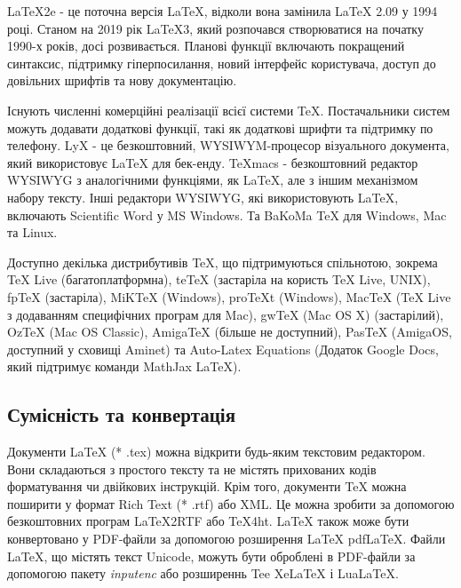 	LaTeX2e - це поточна версія LaTeX, відколи вона замінила LaTeX 2.09 у 1994 році. Станом на 2019 рік LaTeX3, який розпочався створюватися на початку 1990-х років, досі розвивається. Планові функції включають покращений синтаксис, підтримку гіперпосилання, новий інтерфейс користувача, доступ до довільних шрифтів та нову документацію.\cite{latex3}
	
	Існують численні комерційні реалізації всієї системи TeX. Постачальники систем можуть додавати додаткові функції, такі як додаткові шрифти та підтримку по телефону. LyX - це безкоштовний, WYSIWYM-процесор візуального документа, який використовує LaTeX для бек-енду. TeXmacs - безкоштовний редактор WYSIWYG з аналогічними функціями, як LaTeX, але з іншим механізмом набору тексту. Інші редактори WYSIWYG, які використовують LaTeX, включають Scientific Word у MS Windows. Та BaKoMa TeX для Windows, Mac та Linux.
	
	Доступно декілька дистрибутивів TeX, що підтримуються спільнотою, зокрема TeX Live (багатоплатформна), teTeX (застаріла на користь TeX Live, UNIX), fpTeX (застаріла), MiKTeX (Windows), proTeXt (Windows), MacTeX (TeX Live з додаванням специфічних програм для Mac), gwTeX (Mac OS X) (застарілий), OzTeX (Mac OS Classic), AmigaTeX (більше не доступний), PasTeX (AmigaOS, доступний у сховищі Aminet) та Auto-Latex Equations (Додаток Google Docs, який підтримує команди MathJax LaTeX).
	
	\subsection{Сумісність та конвертація}
	
	Документи LaTeX (* .tex) можна відкрити будь-яким текстовим редактором. Вони складаються з простого тексту та не містять прихованих кодів форматування чи двійкових інструкцій. Крім того, документи TeX можна поширити у формат Rich Text (* .rtf) або XML. Це можна зробити за допомогою безкоштовних програм LaTeX2RTF або TeX4ht. LaTeX також може бути конвертовано у PDF-файли за допомогою розширення LaTeX pdfLaTeX. Файли LaTeX, що містять текст Unicode, можуть бути оброблені в PDF-файли за допомогою пакету \textit{inputenc} або розширеннь Tee XeLaTeX і LuaLaTeX.
	
